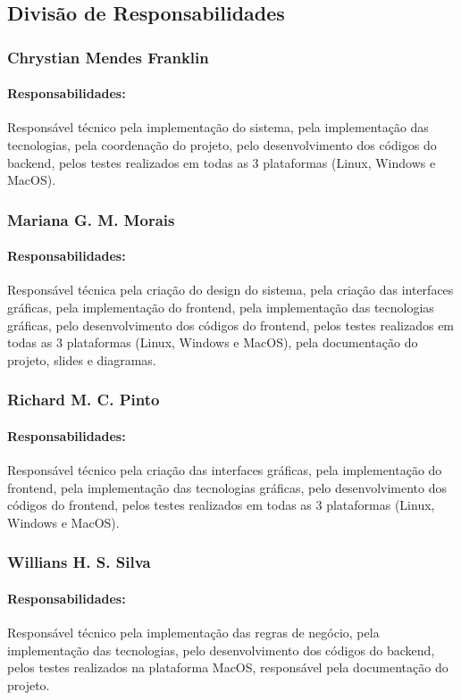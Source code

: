 \documentclass[../main.tex]{subfiles}
\begin{document}
\subsection{Divisão de Responsabilidades}
\subsubsection{Chrystian Mendes Franklin}
\paragraph{Responsabilidades:}
Responsável técnico pela implementação do sistema, pela implementação das tecnologias, pela coordenação do projeto, pelo desenvolvimento dos códigos do backend, pelos testes realizados em todas as 3 plataformas (Linux, Windows e MacOS).

\subsubsection{Mariana G. M. Morais}
\paragraph{Responsabilidades:}
Responsável técnica pela criação do design do sistema, pela criação das interfaces gráficas, pela implementação do frontend, pela implementação das tecnologias gráficas, pelo desenvolvimento dos códigos do frontend, pelos testes realizados em todas as 3 plataformas (Linux, Windows e MacOS), pela documentação do projeto, slides e diagramas.

\subsubsection{Richard M. C. Pinto}
\paragraph{Responsabilidades:}
Responsável técnico pela criação das interfaces gráficas, pela implementação do frontend, pela implementação das tecnologias gráficas, pelo desenvolvimento dos códigos do frontend, pelos testes realizados em todas as 3 plataformas (Linux, Windows e MacOS).

\subsubsection{Willians H. S. Silva}
\paragraph{Responsabilidades:}
Responsável técnico pela implementação das regras de negócio, pela implementação das tecnologias, pelo desenvolvimento dos códigos do backend, pelos testes realizados na plataforma MacOS, responsável pela documentação do projeto.

\end{document}
